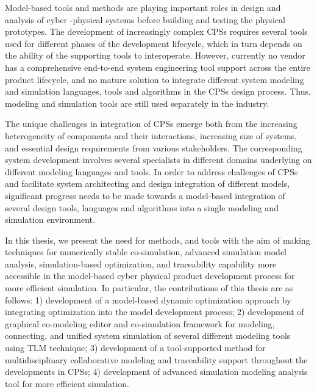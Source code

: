 
Model-based tools and methods are playing important roles in design and analysis of cyber -physical systems before building and testing the physical prototypes. The development of increasingly complex CPSs requires several tools used for different phases of the development lifecycle, which in turn depends on the ability of the supporting tools to interoperate. However, currently no vendor has a comprehensive end-to-end system engineering tool support across the entire product lifecycle, and no mature solution to integrate different system modeling and simulation languages, tools and algorithms in the CPSs design process. Thus, modeling and simulation tools are still used separately in the industry. 

The unique challenges in integration of CPSs emerge both from the increasing heterogeneity of components and their interactions, increasing size of systems, and essential design requirements from various stakeholders. The corresponding system development involves several specialists in different domains underlying on different modeling languages and tools. In order to address challenges of CPSs and facilitate system architecting and design integration of different models, significant progress needs to be made towards a model-based integration of several design tools, languages and algorithms into a single modeling and simulation environment. 

In this thesis, we present the need for methods, and tools with the aim of making techniques for numerically stable co-simulation, advanced simulation model analysis, simulation-based optimization, and traceability capability more accessible in the model-based cyber physical product development process for more efficient simulation. In particular, the contributions of this thesis are as follows: 1) development of a model-based dynamic optimization approach by integrating optimization into the model development process; 2) development of graphical co-modeling editor and co-simulation framework for modeling, connecting, and unified system simulation of several different modeling tools using TLM technique; 3) development of a tool-supported method for multidisciplinary collaborative modeling and traceability support throughout the developments in CPSs; 4) development of advanced simulation modeling analysis tool for more efficient simulation.




